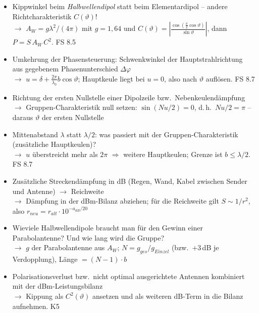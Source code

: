\documentclass[a4paper,10pt]{article}
\begin{document}
\begin{tcolorbox}[colback=A5Farbe!4, colframe=A5Farbe!55, boxrule=0.5pt, arc=1mm, left=3mm, right=2mm, top=2mm, bottom=2mm, breakable, title={\sffamily\bfseries\small Was diesmal neu drankommen könnte \normalfont\itshape\footnotesize -- eigene Prognose (keine offizielle Ankündigung): Umkehrungen, Kombinationen und Transfers zwischen den Aufgabentypen}, coltitle=white, colbacktitle=A5Farbe!70]
\sffamily\small
\begin{itemize}\setlength{\itemsep}{2.2mm}\setlength{\leftmargini}{4mm}
\item Kippwinkel beim \emph{Halbwellendipol} statt beim Elementardipol -- andere Richtcharakteristik $C(\vartheta)$!\\[0.6mm] {\footnotesize\color{A5Farbe}$\rightarrow$ $A_W=g\lambda^2/(4\pi)$ mit $g=1{,}64$ und $C(\vartheta)=\left|\frac{\cos(\frac{\pi}{2}\cos\vartheta)}{\sin\vartheta}\right|$, dann $P=S\,A_W\,C^2$. FS 8.5}
\item Umkehrung der Phasensteuerung: Schwenkwinkel der Hauptstrahlrichtung aus gegebenem Phasenunterschied $\Delta\varphi$\\[0.6mm] {\footnotesize\color{A5Farbe}$\rightarrow$ $u=\delta+\frac{2\pi}{\lambda_0}b\cos\vartheta$; Hauptkeule liegt bei $u=0$, also nach $\vartheta$ auflösen. FS 8.7}
\item Richtung der ersten Nullstelle einer Dipolzeile bzw.\ Nebenkeulendämpfung\\[0.6mm] {\footnotesize\color{A5Farbe}$\rightarrow$ Gruppen-Charakteristik null setzen: $\sin(Nu/2)=0$, d.\,h.\ $Nu/2=\pi$ -- daraus $\vartheta$ der ersten Nullstelle}
\item Mittenabstand $\lambda$ statt $\lambda/2$: was passiert mit der Gruppen-Charakteristik (zusätzliche Hauptkeulen)?\\[0.6mm] {\footnotesize\color{A5Farbe}$\rightarrow$ $u$ überstreicht mehr als $2\pi$ $\Rightarrow$ weitere Hauptkeulen; Grenze ist $b\le\lambda/2$. FS 8.7}
\item Zusätzliche Streckendämpfung in dB (Regen, Wand, Kabel zwischen Sender und Antenne) $\rightarrow$ Reichweite\\[0.6mm] {\footnotesize\color{A5Farbe}$\rightarrow$ Dämpfung in der dBm-Bilanz abziehen; für die Reichweite gilt $S\sim1/r^2$, also $r_{neu}=r_{alt}\cdot10^{-a_{dB}/20}$}
\item Wieviele Halbwellendipole braucht man für den Gewinn einer Parabolantenne? Und wie lang wird die Gruppe?\\[0.6mm] {\footnotesize\color{A5Farbe}$\rightarrow$ $g$ der Parabolantenne aus $A_W$; $N=g_{ges}/g_{Einzel}$ (bzw.\ $+3$\,dB je Verdopplung), Länge $=(N-1)\cdot b$}
\item Polarisationsverlust bzw.\ nicht optimal ausgerichtete Antennen kombiniert mit der dBm-Leistungsbilanz\\[0.6mm] {\footnotesize\color{A5Farbe}$\rightarrow$ Kippung als $C^2(\vartheta)$ ansetzen und als weiteren dB-Term in die Bilanz aufnehmen. K5}
\end{itemize}\end{tcolorbox}
\end{document}
